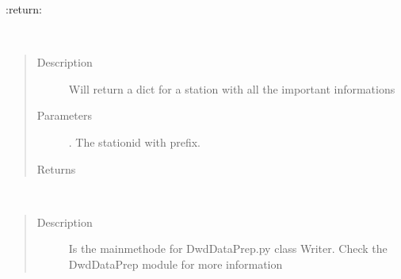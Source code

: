 \documentclass[letterpaper,10pt,english]{sphinxmanual}
\begin{document}
\begin{fulllineitems}
\begin{fulllineitems}
\begin{quote}
\begin{description}
\end{description}\end{quote}

\sphinxAtStartPar
:return:

\end{fulllineitems}


\begin{fulllineitems}
\label{\detokenize{DwdMain:DwdMain.DwdMain.main_station_information}}~\begin{quote}\begin{description}
\item[{Description}] \leavevmode
\sphinxAtStartPar
Will return a dict for a station with all the important informations

\item[{Parameters}] \leavevmode
\sphinxAtStartPar
{} \textendash{} . The stationid with prefix.

\item[{Returns}] \leavevmode
\sphinxAtStartPar
{}

\end{description}\end{quote}

\end{fulllineitems}


\begin{fulllineitems}
\label{\detokenize{DwdMain:DwdMain.DwdMain.main_writer}}~\begin{quote}\begin{description}
\item[{Description}] \leavevmode
\sphinxAtStartPar
Is the main\sphinxhyphen{}methode for DwdDataPrep.py class Writer. Check the DwdDataPrep module for more information


\end{description}
\end{quote}
\end{fulllineitems}
\end{fulllineitems}
\end{document}
